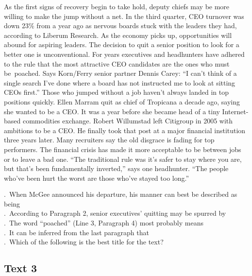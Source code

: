  As the first signs of recovery begin to take hold, deputy chiefs may be more willing to make the jump without a net. In the third quarter, CEO turnover was down 23\% from a year ago as nervous boards stuck with the leaders they had, according to Liberum Research. As the economy picks up, opportunities will abound for aspiring leaders.
 The decision to quit a senior position to look for a better one is unconventional. For years executives and headhunters have adhered to the rule that the most attractive CEO candidates are the ones who must be poached. Says Korn/Ferry senior partner Dennis Carey: “I can’t think of a single search I’ve done where a board has not instructed me to look at sitting CEOs first.”
 Those who jumped without a job haven’t always landed in top positions quickly. Ellen Marram quit as chief of Tropicana a decade ago, saying she wanted to be a CEO. It was a year before she became head of a tiny Internet-based commodities exchange. Robert Willumstad left Citigroup in 2005 with ambitions to be a CEO. He finally took that post at a major financial institution three years later.
 Many recruiters say the old disgrace is fading for top
 performers. The financial crisis has made it more acceptable to be between jobs or to leave a bad one. “The traditional rule was it’s safer to stay where you are, but that’s been fundamentally inverted,” says one headhunter. “The people who’ve been hurt the worst are those who’ve stayed too long.”
 \begin{questions} . When McGee announced his departure, his manner can best be described as being
 \\ . According to Paragraph 2, senior executives’ quitting may be spurred by
 \\ . The word “poached” (Line 3, Paragraph 4) most probably means
 \\ . It can be inferred from the last paragraph that
 \\ . Which of the following is the best title for the text?
 \\ \end{questions}      \subsection{Text 3}
